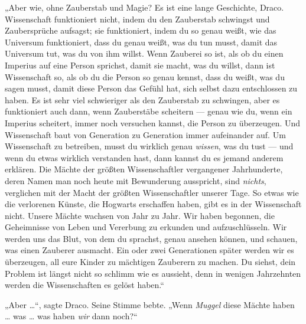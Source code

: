 „Aber wie, ohne Zauberstab und Magie? Es ist eine lange Geschichte, Draco. Wissenschaft funktioniert nicht, indem du den Zauberstab schwingst und Zaubersprüche aufsagst; sie funktioniert, indem du so genau weißt, wie das Universum funktioniert, dass du genau weißt, was du tun musst, damit das Universum tut, was du von ihm willst. Wenn Zauberei so ist, als ob du einen Imperius auf eine Person sprichst, damit sie macht, was du willst, dann ist Wissenschaft so, als ob du die Person so genau kennst, dass du weißt, was du sagen musst, damit diese Person das Gefühl hat, sich selbst dazu entschlossen zu haben. Es ist sehr viel schwieriger als den Zauberstab zu schwingen, aber es funktioniert auch dann, wenn Zauberstäbe scheitern — genau wie du, wenn ein Imperius scheitert, immer noch versuchen kannst, die Person zu überzeugen. Und Wissenschaft baut von Generation zu Generation immer aufeinander auf. Um Wissenschaft zu betreiben, musst du wirklich genau \emph{wissen}, was du tust — und wenn du etwas wirklich verstanden hast, dann kannst du es jemand anderem erklären. Die Mächte der größten Wissenschaftler vergangener Jahrhunderte, deren Namen man noch heute mit Bewunderung ausspricht, sind \emph{nichts}, verglichen mit der Macht der größten Wissenschaftler unserer Tage. So etwas wie die verlorenen Künste, die Hogwarts erschaffen haben, gibt es in der Wissenschaft nicht. Unsere Mächte wachsen von Jahr zu Jahr. Wir haben begonnen, die Geheimnisse von Leben und Vererbung zu erkunden und aufzuschlüsseln. Wir werden uns das Blut, von dem du sprachst, genau ansehen können, und schauen, was einen Zauberer ausmacht. Ein oder zwei Generationen später werden wir es überzeugen, all eure Kinder zu mächtigen Zauberern zu machen. Du siehst, dein Problem ist längst nicht so schlimm wie es aussieht, denn in wenigen Jahrzehnten werden die Wissenschaften es gelöst haben.“

„Aber …“, sagte Draco. Seine Stimme bebte.
„Wenn \emph{Muggel} diese Mächte haben … was … was haben \emph{wir} dann noch?“

